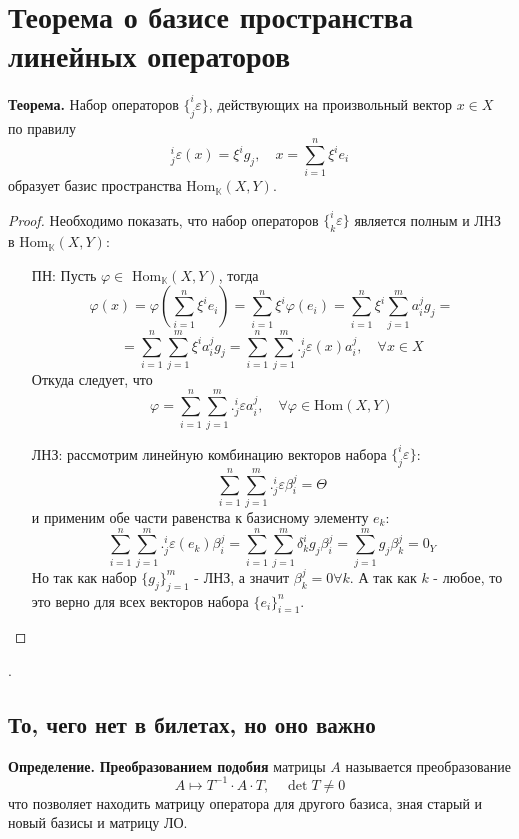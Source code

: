 \documentclass{article}
\newcommand*{\theorem}[2]{\textbf{Теорема#1. } #2 \newline}
\newcommand*{\definition}[1]{\textbf{Определение.} #1 \newline}
\newcommand*{\Hom}[2]{Hom$_\mathbb{K}(#1, #2)$}
\begin{document}
\section{Теорема о базисе пространства линейных операторов}
\theorem{}{Набор операторов $\{ ^i_j\varepsilon \}$, действующих на произвольный вектор $x \in X$ по правилу}
$$
    ^i_j \varepsilon(x) = \xi^ig_j, \quad x = \sum_{i = 1}^{n} \xi^i e_i
$$
образует базис пространства \Hom X Y.
\begin{proof}
    Необходимо показать, что набор операторов $\{ ^i_k \varepsilon \}$ является полным и ЛНЗ в \Hom X Y: 
    \begin{itemize}
        \item[ПН:] Пусть $\varphi \in$ \Hom X Y, тогда
        $$
            \varphi(x) = \varphi(\sum_{i = 1}^{n} \xi^i e_i) = \sum_{i = 1}^{n}\xi^i \varphi(e_i) = \sum_{i = 1}^{n} \xi^i \sum_{j = 1}^{m} a^j_i g_j =
        $$
        $$
            = \sum_{i = 1}^{n} \sum_{j = 1}^{m} \xi^i a_i^j g_j = \sum_{i = 1}^{n} \sum_{j = 1}^{m} .^i_j \varepsilon(x)a^j_i, \quad \forall x \in X
        $$
        Откуда следует, что 
        $$
            \varphi = \sum_{i = 1}^{n} \sum_{j = 1}^{m} .^i_j \varepsilon a^j_i, \quad \forall \varphi \in \text{Hom}(X, Y)
        $$
        \item[ЛНЗ:] рассмотрим линейную комбинацию векторов набора $\{ ^i_j \varepsilon \}$:
        $$
            \sum_{i = 1}^{n} \sum_{j = 1}^{m} .^i_j \varepsilon \beta^j_i = \varTheta
        $$
        и применим обе части равенства к базисному элементу $e_k$: 
        $$
            \sum_{i = 1}^{n} \sum_{j = 1}^{m} .^i_j \varepsilon(e_k)\beta^j_i = \sum_{i = 1}^{n} \sum_{j = 1}^{m} \delta ^i_k g_j \beta^j_i = \sum_{j = 1}^{m} g_j \beta^j_k = 0_Y
        $$
        Но так как набор $\{ g_j \}^m_{j = 1}$ - ЛНЗ, а значит $\beta^j_k = 0 \forall k$. А так как $k$ - любое, то это верно для всех векторов набора $\{e_i\}^n_{i = 1}$. 
    \end{itemize}
\end{proof}
.\newline 
\subsection{То, чего нет в билетах, но оно важно}
\definition{ \textbf{Преобразованием подобия} матрицы $A$ называется преобразование}
$$
    A \mapsto T^{-1} \cdot A \cdot T, \quad \det T \neq 0
$$
что позволяет находить матрицу оператора для другого базиса, зная старый и новый базисы и матрицу ЛО.
\end{document}
